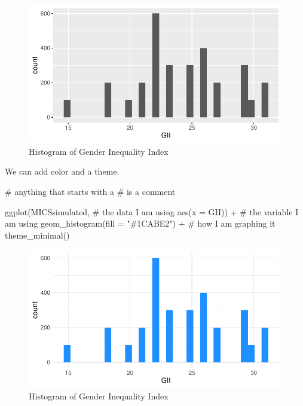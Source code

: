 \documentclass[
  letterpaper,
  DIV=11,
  numbers=noendperiod]{scrreprt}
\newenvironment{Shaded}{\begin{snugshade}}{\end{snugshade}}
\newcommand{\AttributeTok}[1]{\textcolor[rgb]{0.40,0.45,0.13}{#1}}
\newcommand{\CommentTok}[1]{\textcolor[rgb]{0.37,0.37,0.37}{#1}}
\newcommand{\FunctionTok}[1]{\textcolor[rgb]{0.28,0.35,0.67}{#1}}
\newcommand{\NormalTok}[1]{\textcolor[rgb]{0.00,0.23,0.31}{#1}}
\newcommand{\SpecialCharTok}[1]{\textcolor[rgb]{0.37,0.37,0.37}{#1}}
\newcommand{\StringTok}[1]{\textcolor[rgb]{0.13,0.47,0.30}{#1}}
\begin{document}
\begin{figure}[H]

{\centering \includegraphics{quick-intro-ggplot2_files/figure-pdf/fig-ggplot-histogram-1.pdf}

}

\caption{\label{fig-ggplot-histogram}Histogram of Gender Inequality
Index}

\end{figure}

We can add color and a theme.

\begin{Shaded}
\begin{Highlighting}[]
\CommentTok{\# anything that starts with a \textquotesingle{}\#\textquotesingle{} is a comment}

\FunctionTok{ggplot}\NormalTok{(MICSsimulated, }\CommentTok{\# the data I am using}
       \FunctionTok{aes}\NormalTok{(}\AttributeTok{x =}\NormalTok{ GII)) }\SpecialCharTok{+} \CommentTok{\# the variable I am using}
  \FunctionTok{geom\_histogram}\NormalTok{(}\AttributeTok{fill =} \StringTok{"\#1CABE2"}\NormalTok{) }\SpecialCharTok{+} \CommentTok{\# how I am graphing it}
  \FunctionTok{theme\_minimal}\NormalTok{()}
\end{Highlighting}
\end{Shaded}

\begin{figure}[H]

{\centering \includegraphics{quick-intro-ggplot2_files/figure-pdf/fig-ggplot-histogram-color-1.pdf}

}

\caption{\label{fig-ggplot-histogram-color}Histogram of Gender
Inequality Index}

\end{figure}
\end{document}
